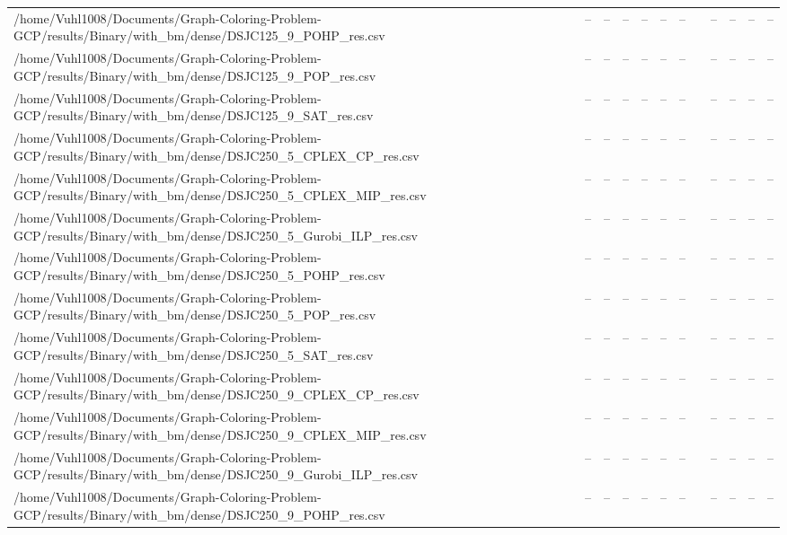 \begin{table}[htbp]
\begin{tabular}{llllllllllll}
/home/Vuhl1008/Documents/Graph-Coloring-Problem-GCP/results/Binary/with\_bm/dense/DSJC125\_9\_POHP\_res.csv & -- & -- & -- & -- & -- & -- & {} & -- & -- & -- & -- \\
/home/Vuhl1008/Documents/Graph-Coloring-Problem-GCP/results/Binary/with\_bm/dense/DSJC125\_9\_POP\_res.csv & -- & -- & -- & -- & -- & -- & {} & -- & -- & -- & -- \\
/home/Vuhl1008/Documents/Graph-Coloring-Problem-GCP/results/Binary/with\_bm/dense/DSJC125\_9\_SAT\_res.csv & -- & -- & -- & -- & -- & -- & {} & -- & -- & -- & -- \\
/home/Vuhl1008/Documents/Graph-Coloring-Problem-GCP/results/Binary/with\_bm/dense/DSJC250\_5\_CPLEX\_CP\_res.csv & -- & -- & -- & -- & -- & -- & {} & -- & -- & -- & -- \\
/home/Vuhl1008/Documents/Graph-Coloring-Problem-GCP/results/Binary/with\_bm/dense/DSJC250\_5\_CPLEX\_MIP\_res.csv & -- & -- & -- & -- & -- & -- & {} & -- & -- & -- & -- \\
/home/Vuhl1008/Documents/Graph-Coloring-Problem-GCP/results/Binary/with\_bm/dense/DSJC250\_5\_Gurobi\_ILP\_res.csv & -- & -- & -- & -- & -- & -- & {} & -- & -- & -- & -- \\
/home/Vuhl1008/Documents/Graph-Coloring-Problem-GCP/results/Binary/with\_bm/dense/DSJC250\_5\_POHP\_res.csv & -- & -- & -- & -- & -- & -- & {} & -- & -- & -- & -- \\
/home/Vuhl1008/Documents/Graph-Coloring-Problem-GCP/results/Binary/with\_bm/dense/DSJC250\_5\_POP\_res.csv & -- & -- & -- & -- & -- & -- & {} & -- & -- & -- & -- \\
/home/Vuhl1008/Documents/Graph-Coloring-Problem-GCP/results/Binary/with\_bm/dense/DSJC250\_5\_SAT\_res.csv & -- & -- & -- & -- & -- & -- & {} & -- & -- & -- & -- \\
/home/Vuhl1008/Documents/Graph-Coloring-Problem-GCP/results/Binary/with\_bm/dense/DSJC250\_9\_CPLEX\_CP\_res.csv & -- & -- & -- & -- & -- & -- & {} & -- & -- & -- & -- \\
/home/Vuhl1008/Documents/Graph-Coloring-Problem-GCP/results/Binary/with\_bm/dense/DSJC250\_9\_CPLEX\_MIP\_res.csv & -- & -- & -- & -- & -- & -- & {} & -- & -- & -- & -- \\
/home/Vuhl1008/Documents/Graph-Coloring-Problem-GCP/results/Binary/with\_bm/dense/DSJC250\_9\_Gurobi\_ILP\_res.csv & -- & -- & -- & -- & -- & -- & {} & -- & -- & -- & -- \\
/home/Vuhl1008/Documents/Graph-Coloring-Problem-GCP/results/Binary/with\_bm/dense/DSJC250\_9\_POHP\_res.csv & -- & -- & -- & -- & -- & -- & {} & -- & -- & -- & -- \\

\end{tabular}
\end{table}
